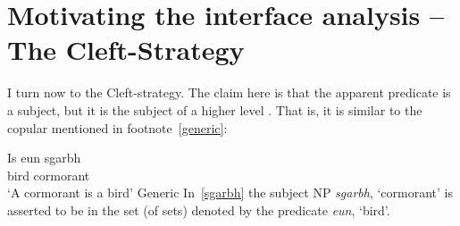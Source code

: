 \documentclass[output=paper]{langsci/langscibook}
\begin{document}
%
%
%

%
\section{Motivating the interface analysis -- The Cleft-Strategy}\label{motiv2}

I turn now to the Cleft-strategy. The claim here is that the apparent predicate
is a subject, but it is the subject of a higher level . That is, it
is similar to the copular  mentioned in footnote~\eqref{generic}:

\ea {} \label{sgarbh}
\sn
\gll   Is eun sgarbh\\
\Cop{} bird cormorant\\
\glt \enquote*{A cormorant is a bird} \hfill Generic
\z
In~\eqref{sgarbh} the subject NP \emph{sgarbh}, `cormorant' is asserted to be in
the set (of sets) denoted by the predicate \emph{eun}, `bird'.
\end{document}
